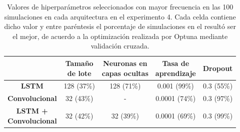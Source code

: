 \documentclass[../../main.tex]{subfiles}
\begin{document}
\begin{table}[H]
    \centering
    \renewcommand{\arraystretch}{1.2}
    \begin{tabular}{|c|c|c|c|c|}
        \hline
            & \makecell{\textbf{Tamaño}\\\textbf{de lote}}
            & \makecell{\textbf{Neuronas en}\\\textbf{capas ocultas}}
            & \makecell{\textbf{Tasa de}\\\textbf{aprendizaje}}
            & \textbf{Dropout} \\ \hline\hline
        \textbf{LSTM}
            & 128 (37\%) & 128 (71\%) & 0.001 (99\%)  & 0.3 (55\%) \\ \hline
        \textbf{Convolucional}
            & 32 (43\%) & -           & 0.0001 (74\%) & 0.3 (97\%) \\ \hline
        \makecell{\textbf{LSTM +}\\\textbf{Convolucional}}
            & 32 (42\%) & 32 (39\%)   & 0.0001 (69\%) & 0.3 (99\%) \\
        \hline
    \end{tabular}
    \caption{Valores de hiperparámetros seleccionados con mayor frecuencia en las 100
    simulaciones en cada arquitectura en el experimento 4. Cada celda contiene dicho valor
    y entre paréntesis el porcentaje de simulaciones en el resultó ser el mejor, de
    acuerdo a la optimización realizada por Optuna mediante validación cruzada.}
    \label{tab:hyperparams_exp4}
\end{table}
\end{document}
